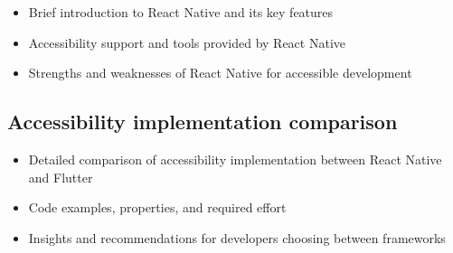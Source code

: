 \begin{itemize}
\item Brief introduction to React Native and its key features
\item Accessibility support and tools provided by React Native
\item Strengths and weaknesses of React Native for accessible development
\end{itemize}

\subsection{Accessibility implementation comparison}

\begin{itemize}
\item Detailed comparison of accessibility implementation between React Native and Flutter
\item Code examples, properties, and required effort
\item Insights and recommendations for developers choosing between frameworks
\end{itemize}

\newpage




% 

